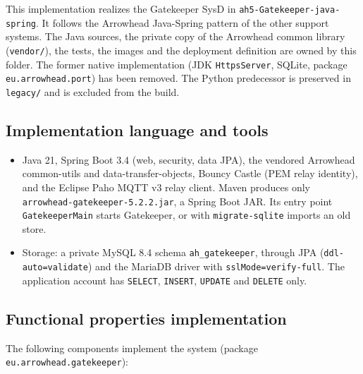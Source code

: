\documentclass[a4paper]{arrowhead}
\begin{document}
This implementation realizes the Gatekeeper SysD in \texttt{ah5-\allowbreak{}Gatekeeper-\allowbreak{}java-\allowbreak{}spring}. It follows the Arrowhead Java-Spring pattern of the other support systems. The Java sources, the private copy of the Arrowhead common library (\texttt{vendor/}), the tests, the images and the deployment definition are owned by this folder. The former native implementation (JDK \texttt{HttpsServer}, SQLite, package \texttt{eu.\allowbreak{}arrowhead.\allowbreak{}port}) has been removed. The Python predecessor is preserved in \texttt{legacy/\allowbreak{}} and is excluded from the build.

\subsection{Implementation language and tools}
\begin{itemize}
\item Java 21, Spring Boot 3.4 (web, security, data JPA), the vendored Arrowhead common-utils and data-transfer-objects, Bouncy Castle (PEM relay identity), and the Eclipse Paho MQTT v3 relay client. Maven produces only \texttt{arrowhead-\allowbreak{}gatekeeper-\allowbreak{}5.2.2.jar}, a Spring Boot JAR. Its entry point \texttt{GatekeeperMain} starts Gatekeeper, or with \texttt{migrate-\allowbreak{}sqlite} imports an old store.
\item Storage: a private MySQL 8.4 schema \texttt{ah\_\allowbreak{}gatekeeper}, through JPA (\texttt{ddl-\allowbreak{}auto=validate}) and the MariaDB driver with \texttt{sslMode=verify-\allowbreak{}full}. The application account has \texttt{SELECT}, \texttt{INSERT}, \texttt{UPDATE} and \texttt{DELETE} only.
\end{itemize}

\subsection{Functional properties implementation}

The following components implement the system (package \texttt{eu.\allowbreak{}arrowhead.\allowbreak{}gatekeeper}):
\end{document}
